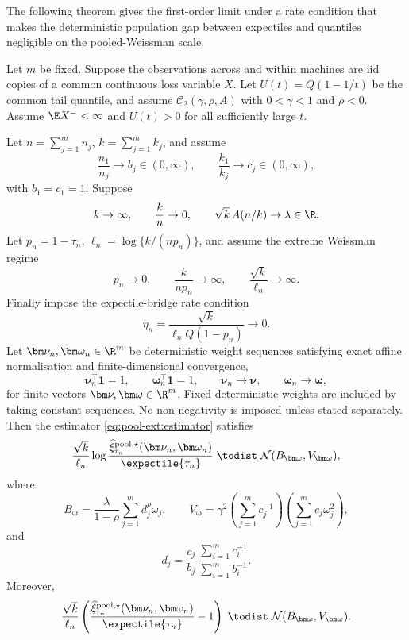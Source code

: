 The following theorem gives the first-order limit under a rate condition that
makes the deterministic population gap between expectiles and quantiles
negligible on the pooled-Weissman scale.

\begin{theorem}
\label{thm:pool-ext:deterministic}
Let \(m\) be fixed. Suppose the observations across and within machines are
iid copies of a common continuous loss variable \(X\). Let
\(U(t)=Q(1-1/t)\) be the common tail quantile, and assume
\(\mathcal C_2(\gamma,\rho,A)\) with \(0<\gamma<1\) and \(\rho<0\). Assume
\(\E X^{-}<\infty\) and \(U(t)>0\) for all sufficiently large \(t\).

Let \(n=\sum_{j=1}^{m}n_j\), \(k=\sum_{j=1}^{m}k_j\), and assume
\[
  \frac{n_1}{n_j}\to b_j\in(0,\infty),
  \qquad
  \frac{k_1}{k_j}\to c_j\in(0,\infty),
\]
with \(b_1=c_1=1\). Suppose
\[
  k\to\infty,
  \qquad
  \frac{k}{n}\to0,
  \qquad
  \sqrt{k}\,A(n/k)\to\lambda\in\R.
\]
Let \(p_n=1-\tau_n\), \(\ell_n=\log\{k/(np_n)\}\), and assume the extreme
Weissman regime
\[
  p_n\to0,
  \qquad
  \frac{k}{np_n}\to\infty,
  \qquad
  \frac{\sqrt{k}}{\ell_n}\to\infty.
\]
Finally impose the expectile-bridge rate condition
\begin{equation}
\label{eq:pool-ext:eta}
  \eta_n
  =
  \frac{\sqrt{k}}{\ell_n Q(1-p_n)}
  \to0.
\end{equation}
Let \(\bm\nu_n,\bm\omega_n\in\R^m\) be deterministic weight sequences
satisfying exact affine normalisation and finite-dimensional convergence,
\[
  \bm\nu_n^\top\bm 1=1,
  \qquad
  \bm\omega_n^\top\bm 1=1,
  \qquad
  \bm\nu_n\to\bm\nu,
  \qquad
  \bm\omega_n\to\bm\omega,
\]
for finite vectors \(\bm\nu,\bm\omega\in\R^m\). Fixed deterministic weights
are included by taking constant sequences. No non-negativity is imposed unless
stated separately. Then the estimator
\eqref{eq:pool-ext:estimator} satisfies
\begin{equation}
\label{eq:pool-ext:log-limit}
  \frac{\sqrt{k}}{\ell_n}
  \log
  \frac{
    \widehat\xi_{\tau_n}^{\mathrm{pool},\star}(\bm\nu_n,\bm\omega_n)
  }{\expectile{\tau_n}}
  \;\todist\;
  \mathcal N(B_{\bm\omega},V_{\bm\omega}),
\end{equation}
where
\[
  B_{\bm\omega}
  =
  \frac{\lambda}{1-\rho}
  \sum_{j=1}^{m}d_j^\rho\omega_j,
  \qquad
  V_{\bm\omega}
  =
  \gamma^2
  \left(\sum_{j=1}^{m}c_j^{-1}\right)
  \left(\sum_{j=1}^{m}c_j\omega_j^2\right),
\]
and
\[
  d_j
  =
  \frac{c_j}{b_j}\,
  \frac{\sum_{i=1}^{m}c_i^{-1}}{\sum_{i=1}^{m}b_i^{-1}}.
\]
Moreover,
\begin{equation}
\label{eq:pool-ext:relative-limit}
  \frac{\sqrt{k}}{\ell_n}
  \left(
    \frac{
      \widehat\xi_{\tau_n}^{\mathrm{pool},\star}(\bm\nu_n,\bm\omega_n)
    }{\expectile{\tau_n}}
    -1
  \right)
  \;\todist\;
  \mathcal N(B_{\bm\omega},V_{\bm\omega}).
\end{equation}
\end{theorem}

